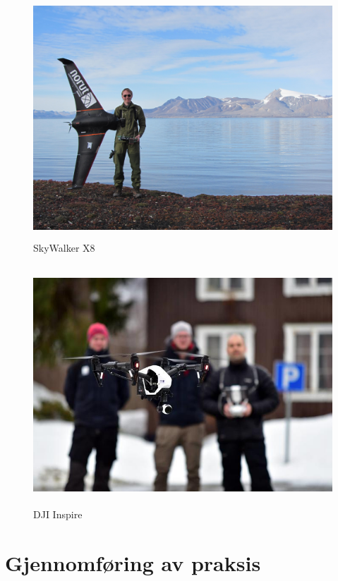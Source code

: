 \documentclass[12pt, a4paper]{article}
\begin{document}
\newpage

\begin{figure}[hpbt]
	\centering
	\includegraphics[width=.6\textwidth, height=9cm]{bilder/SkyWalker_X8.jpg}
	\caption{SkyWalker X8}
\end{figure}

\begin{figure}[h!]
	\centering
	\includegraphics[width = .6\textwidth, height = 9cm]{bilder/Dji_inspire.jpg}
	\caption{DJI Inspire}
\end{figure}

\newpage
\section{Gjennomføring av praksis}
\end{document}
